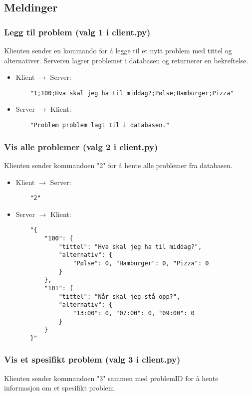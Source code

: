 \documentclass[hidelinks]{article}
\begin{document}
\subsection{Meldinger}

\subsubsection{Legg til problem (valg 1 i client.py)}
Klienten sender en kommando for å legge til et nytt problem med tittel og alternativer. Serveren lagrer problemet i databasen og returnerer en bekreftelse.

\begin{itemize}
    \item Klient \(\rightarrow\) Server:
    \begin{verbatim}
    "1;100;Hva skal jeg ha til middag?;Pølse;Hamburger;Pizza"
    \end{verbatim}
    \item Server \(\rightarrow\) Klient:
    \begin{verbatim}
    "Problem problem lagt til i databasen."
    \end{verbatim}
\end{itemize}

\subsubsection{Vis alle problemer (valg 2 i client.py)}
Klienten sender kommandoen "2" for å hente alle problemer fra databasen.

\begin{itemize}
    \item Klient \(\rightarrow\) Server:
    \begin{verbatim}
    "2"
    \end{verbatim}
    \item Server \(\rightarrow\) Klient:
    \begin{verbatim}
    "{
        "100": {
            "tittel": "Hva skal jeg ha til middag?",
            "alternativ": {
                "Pølse": 0, "Hamburger": 0, "Pizza": 0
            }
        },
        "101": {
            "tittel": "Når skal jeg stå opp?",
            "alternativ": {
                "13:00": 0, "07:00": 0, "09:00": 0
            }
        }
    }"
    \end{verbatim}
\end{itemize}

\subsubsection{Vis et spesifikt problem (valg 3 i client.py)}
Klienten sender kommandoen "3" sammen med problemID for å hente informasjon om et spesifikt problem.
\end{document}
